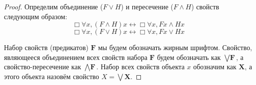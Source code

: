 \begin{proof}
Определим объединение ($F\lor H$) и пересечение ($F \land H$) свойств следующим образом:
$$\Box \forall x, (F\land H) x \leftrightarrow \Box \forall x, Fx\land Hx$$
$$\Box \forall x, (F\lor H) x \leftrightarrow \Box \forall x, Fx\lor Hx$$


Набор свойств (предикатов) $\textbf{F}$ мы будем обозначать жирным шрифтом. Свойство, являющееся объединением всех свойств набора $\textbf{F}$ будем обозначать как $\bigvee\textbf{F}$, а свойство-пересечение как $\bigwedge\textbf{F}$. Набор всех свойств объекта $x$ обозначим как $\textbf{X}$, а  этого объекта назовём свойство $X = \bigvee \textbf{X}$.


\end{proof}
